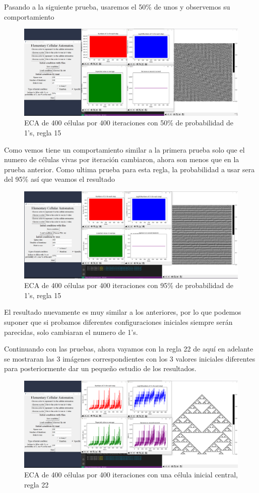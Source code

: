 \documentclass[11pt]{article}
\begin{document}
		Pasando a la siguiente prueba, usaremos el 50\% de unos y observemos su comportamiento
		\begin{figure}[H]
			\centering
			\includegraphics[scale=0.26]{resources/add2.png}
			\caption{ECA de 400 células por 400 iteraciones con 50\% de probabilidad de 1's, regla 15}								\label{fig:picture}
		\end{figure}		
		Como vemos tiene un comportamiento similar a la primera prueba solo que el numero de células vivas por iteración cambiaron, ahora son menos que en la prueba anterior.
		Como ultima prueba para esta regla, la probabilidad a usar sera del 95\% así que veamos el resultado
		\begin{figure}[H]
			\centering
			\includegraphics[scale=0.26]{resources/add3.png}
			\caption{ECA de 400 células por 400 iteraciones con 95\% de probabilidad de 1's, regla 15}								\label{fig:picture}
		\end{figure}		
		El resultado nuevamente es muy similar a los anteriores, por lo que podemos suponer que si probamos diferentes configuraciones iniciales siempre serán parecidas, solo cambiaran el numero de 1's.\par
		Continuando con las pruebas, ahora vayamos con la regla 22 de aquí en adelante se mostraran las 3 imágenes correspondientes con los 3 valores iniciales diferentes para posteriormente dar un pequeño estudio de los resultados.
		\begin{figure}[H]
			\centering
			\includegraphics[scale=0.26]{resources/add4.png}
			\caption{ECA de 400 células por 400 iteraciones con una célula inicial central, regla 22}								\label{fig:picture}
		\end{figure}
\end{document}
